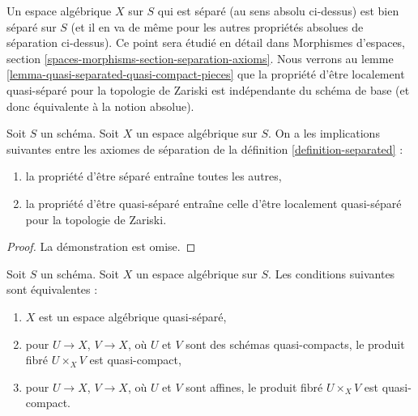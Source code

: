 \noindent
Un espace algébrique $X$ sur $S$ qui est séparé
(au sens absolu ci-dessus) est bien séparé sur $S$ (et il en va de même
pour les autres propriétés absolues de séparation ci-dessus). Ce point sera étudié
en détail dans
Morphismes d'espaces, section \ref{spaces-morphisms-section-separation-axioms}.
Nous verrons au
lemme \ref{lemma-quasi-separated-quasi-compact-pieces}
que la propriété d'être localement quasi-séparé pour la topologie de Zariski est indépendante du schéma de base
(et donc équivalente à la notion absolue).

\begin{lemma}
\label{lemma-trivial-implications}
Soit $S$ un schéma.
Soit $X$ un espace algébrique sur $S$.
On a les implications suivantes entre les axiomes de séparation
de la définition \ref{definition-separated} :
\begin{enumerate}
\item la propriété d'être séparé entraîne toutes les autres,
\item la propriété d'être quasi-séparé entraîne celle d'être localement quasi-séparé pour la topologie de Zariski.
\end{enumerate}
\end{lemma}

\begin{proof}
La démonstration est omise.
\end{proof}

\begin{lemma}
\label{lemma-characterize-quasi-separated}
Soit $S$ un schéma. Soit $X$ un espace algébrique sur $S$.
Les conditions suivantes sont équivalentes :
\begin{enumerate}
\item $X$ est un espace algébrique quasi-séparé,
\item pour $U \to X$, $V \to X$, où $U$ et $V$ sont des schémas quasi-compacts,
le produit fibré $U \times_X V$ est quasi-compact,
\item pour $U \to X$, $V \to X$, où $U$ et $V$ sont affines,
le produit fibré $U \times_X V$ est quasi-compact.
\end{enumerate}
\end{lemma}

